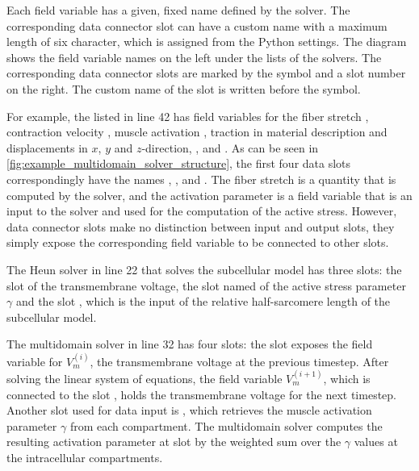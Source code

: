 Each field variable has a given, fixed name defined by the solver. The corresponding data connector slot can have a custom name with a maximum length of six character, which is assigned from the Python settings.
The diagram shows the field variable names on the left under the  lists of the solvers. The corresponding data connector slots are marked by the  symbol and a slot number on the right. The custom name of the slot is written before the  symbol.

For example, the  listed in line 42 has field variables for the fiber stretch \code{$\lambda$}, contraction velocity , muscle activation \code{$\gamma$}, traction in material description  and displacements in $x$, $y$ and $z$-direction, ,  and . As can be seen in \cref{fig:example_multidomain_solver_structure}, the first four data  slots correspondingly have the names , ,  and . The fiber stretch \code{$\lambda$} is a quantity that is computed by the solver, and the activation parameter \code{$\gamma$} is a field variable that is an input to the solver and used for the computation of the active stress. However, data connector slots make no distinction between input and output slots, they simply expose the corresponding field variable to be connected to other slots.

The Heun solver in line 22 that solves the subcellular model has three slots: the slot  of the transmembrane voltage, the slot named  of the active stress parameter $\gamma$ and the slot , which is the input of the relative half-sarcomere length of the subcellular model.

The multidomain solver in line 32 has four slots: the slot  exposes the field variable for $V_m^{(i)}$, the transmembrane voltage at the previous timestep. After solving the linear system of equations, the field variable $V_m^{(i+1)}$, which is connected to the slot , holds the transmembrane voltage for the next timestep. Another slot used for data input is , which retrieves the muscle activation parameter $\gamma$ from each compartment. The multidomain solver computes the resulting activation parameter at slot  by the weighted sum over the $\gamma$ values at the intracellular compartments. 

